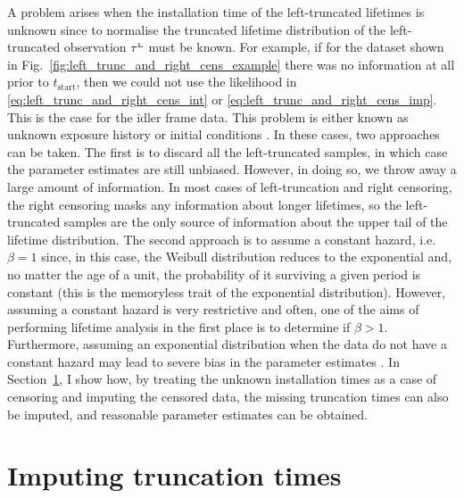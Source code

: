 A problem arises when the installation time of the left-truncated lifetimes is unknown since to normalise the truncated lifetime distribution of the left-truncated observation $\tau^{\hbox{\tiny{L}}}$ must be known. For example, if for the dataset shown in Fig.~\ref{fig:left_trunc_and_right_cens_example} there was no information at all prior to $t_\text{start}$, then we could not use the likelihood in \eqref{eq:left_trunc_and_right_cens_int} or \eqref{eq:left_trunc_and_right_cens_imp}. This is the case for the idler frame data. This problem is either known as unknown exposure history or initial conditions \citep{guo1993}. In these cases, two approaches can be taken. The first is to discard all the left-truncated samples, in which case the parameter estimates are still unbiased. However, in doing so, we throw away a large amount of information. In most cases of left-truncation and right censoring, the right censoring masks any information about longer lifetimes, so the left-truncated samples are the only source of information about the upper tail of the lifetime distribution. The second approach is to assume a constant hazard, i.e. $\beta = 1$ since, in this case, the Weibull distribution reduces to the exponential and, no matter the age of a unit, the probability of it surviving a given period is constant (this is the memoryless trait of the exponential distribution). However, assuming a constant hazard is very restrictive and often, one of the aims of performing lifetime analysis in the first place is to determine if $\beta > 1$. Furthermore, assuming an exponential distribution when the data do not have a constant hazard may lead to severe bias in the parameter estimates \citep{heckman1986}. In Section~\ref{sec:lt-imputation}, I show how, by treating the unknown installation times as a case of censoring and imputing the censored data, the missing truncation times can also be imputed, and reasonable parameter estimates can be obtained.

\section{Imputing truncation times} \label{sec:lt-imputation}

